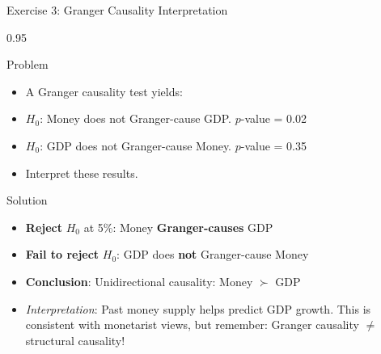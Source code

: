 \documentclass[9pt, aspectratio=169, t]{beamer}
\begin{document}
\begin{frame}{Exercise 3: Granger Causality Interpretation}
    \begin{cminipage}{0.95\textwidth}
    \begin{alertblock}{Problem}
        \begin{itemize}\setlength{\itemsep}{0pt}
            \item A Granger causality test yields:
            \item $H_0$: Money does not Granger-cause GDP. $p$-value = 0.02
            \item $H_0$: GDP does not Granger-cause Money. $p$-value = 0.35
            \item Interpret these results.
        \end{itemize}
    \end{alertblock}

    \vspace{0.15cm}
    \begin{exampleblock}{Solution}
        \begin{itemize}\setlength{\itemsep}{2pt}
            \item \textbf{Reject} $H_0$ at 5\%: Money \textbf{Granger-causes} GDP
            \item \textbf{Fail to reject} $H_0$: GDP does \textbf{not} Granger-cause Money
            \item \textbf{Conclusion}: Unidirectional causality: Money $\succ$ GDP
            \item \textit{Interpretation}: Past money supply helps predict GDP growth. This is consistent with monetarist views, but remember: Granger causality $\neq$ structural causality!
        \end{itemize}
    \end{exampleblock}
    \end{cminipage}
\end{frame}
\end{document}
